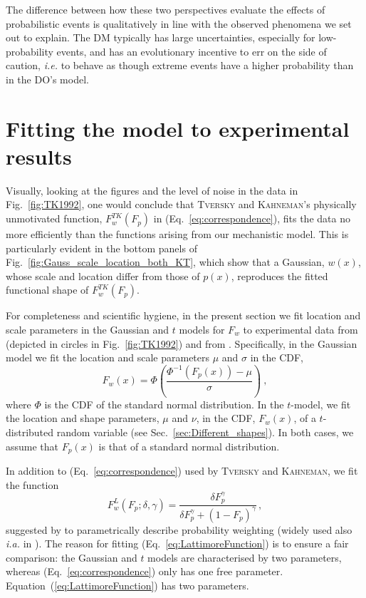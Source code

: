 \documentclass[a4paper, 12pt]{article}
\newcommand{\person}[1]{\textsc{#1}\xspace}
\newcommand{\elabel}[1]{\label{eq:#1}}
\newcommand{\eref}[1]{(Eq.~\ref{eq:#1})}
\newcommand{\Eref}[1]{Equation~(\ref{eq:#1})}
\newcommand{\fref}[1]{Fig.~\ref{fig:#1}}
\newcommand{\seclabel}[1]{\label{sec:#1}}
\newcommand{\secref}[1]{Sec.~\ref{sec:#1}}
\newcommand{\ia}{\textit{i.a.}\xspace}
\newcommand{\ie}{\textit{i.e.}\xspace}
\newcommand{\be}{\begin{equation}}
\newcommand{\ee}{\end{equation}}
\begin{document}
The difference between how these two perspectives evaluate the effects of probabilistic events is qualitatively in line with the observed phenomena we set out to explain. The DM typically has large uncertainties, especially for low-probability events, and has an evolutionary incentive to err on the side of caution, \ie to behave as though extreme events have a higher probability than in the DO's model.

\section{Fitting the model to experimental results \seclabel{Fitting_the}}
Visually, looking at the figures and the level of noise in the data in \fref{TK1992}, one would conclude that \person{Tversky} and \person{Kahneman}'s physically unmotivated function, $F^{TK}_w(F_p)$ in \eref{correspondence}, fits the data no more efficiently than the functions arising from our mechanistic model. This is particularly evident in the bottom panels of \fref{Gauss_scale_location_both_KT}, which show that a Gaussian, $w(x)$, whose scale and location differ from those of $p(x)$, reproduces the fitted functional shape of $F^{TK}_w(F_p)$.

For completeness and scientific hygiene, in the present section we fit location and scale parameters in the Gaussian and $t$ models for $F_w$ to experimental data from \textcite{TverskyKahneman1992} (depicted in circles in \fref{TK1992}) and from \textcite{TverskyFox1995}. Specifically, in the Gaussian model we fit the location and scale parameters $\mu$ and $\sigma$ in the CDF,
%
\be
F_w\left(x\right) = \Phi\left(\frac{\Phi^{-1}\left(F_p\left(x\right)\right) - \mu}{\sigma}\right)~,
\ee
%
where $\Phi$ is the CDF of the standard normal distribution. In the $t$-model, we fit the location and shape parameters, $\mu$ and $\nu$, in the CDF, $F_w(x)$, of a $t$-distributed random variable (see \secref{Different_shapes}). In both cases, we assume that $F_p(x)$ is that of a standard normal distribution.

In addition to \eref{correspondence} used by \person{Tversky} and \person{Kahneman}, we fit the function
%
\be
F^{L}_w\left(F_p; \delta,\gamma\right) =\frac{\delta F_p^{\gamma}}{\delta F_p^{\gamma} + \left(1-F_p\right)^{\gamma}}\,,
\elabel{LattimoreFunction}
\ee
%
suggested by \textcite{LattimoreBakerWitte1992} to parametrically describe probability weighting (widely used also \ia in \textcite{TverskyWakker1995,Prelec1998}). The reason for fitting \eref{LattimoreFunction} is to ensure a fair comparison: the Gaussian and $t$ models are characterised by two parameters, whereas \eref{correspondence} only has one free parameter. \Eref{LattimoreFunction} has two parameters.
\end{document}
